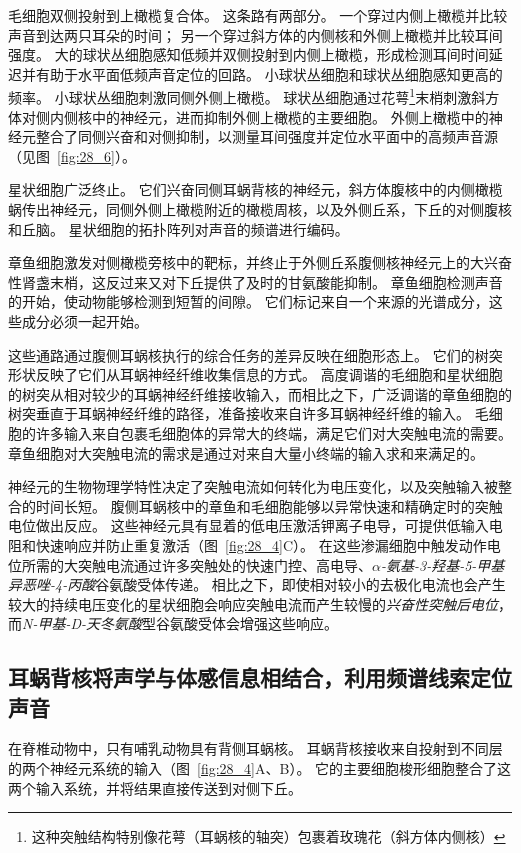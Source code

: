 毛细胞双侧投射到上橄榄复合体。
这条路有两部分。
一个穿过内侧上橄榄并比较声音到达两只耳朵的时间； 另一个穿过斜方体的内侧核和外侧上橄榄并比较耳间强度。
大的球状丛细胞感知低频并双侧投射到内侧上橄榄，形成检测耳间时间延迟并有助于水平面低频声音定位的回路。
小球状丛细胞和球状丛细胞感知更高的频率。
小球状丛细胞刺激同侧外侧上橄榄。
球状丛细胞通过花萼\footnote{这种突触结构特别像花萼（耳蜗核的轴突）包裹着玫瑰花（斜方体内侧核）}末梢刺激斜方体对侧内侧核中的神经元，进而抑制外侧上橄榄的主要细胞。
外侧上橄榄中的神经元整合了同侧兴奋和对侧抑制，以测量耳间强度并定位水平面中的高频声音源（见图~\ref{fig:28_6}）。


星状细胞广泛终止。
它们兴奋同侧耳蜗背核的神经元，斜方体腹核中的内侧橄榄蜗传出神经元，同侧外侧上橄榄附近的橄榄周核，以及外侧丘系，下丘的对侧腹核和丘脑。 
星状细胞的拓扑阵列对声音的频谱进行编码。


章鱼细胞激发对侧橄榄旁核中的靶标，并终止于外侧丘系腹侧核神经元上的大兴奋性肾盏末梢，这反过来又对下丘提供了及时的甘氨酸能抑制。
章鱼细胞检测声音的开始，使动物能够检测到短暂的间隙。
它们标记来自一个来源的光谱成分，这些成分必须一起开始。


这些通路通过腹侧耳蜗核执行的综合任务的差异反映在细胞形态上。
它们的树突形状反映了它们从耳蜗神经纤维收集信息的方式。
高度调谐的毛细胞和星状细胞的树突从相对较少的耳蜗神经纤维接收输入，而相比之下，广泛调谐的章鱼细胞的树突垂直于耳蜗神经纤维的路径，准备接收来自许多耳蜗神经纤维的输入。
毛细胞的许多输入来自包裹毛细胞体的异常大的终端，满足它们对大突触电流的需要。
章鱼细胞对大突触电流的需求是通过对来自大量小终端的输入求和来满足的。


神经元的生物物理学特性决定了突触电流如何转化为电压变化，以及突触输入被整合的时间长短。
腹侧耳蜗核中的章鱼和毛细胞能够以异常快速和精确定时的突触电位做出反应。
这些神经元具有显着的低电压激活钾离子电导，可提供低输入电阻和快速响应并防止重复激活（图~\ref{fig:28_4}C）。
在这些渗漏细胞中触发动作电位所需的大突触电流通过许多突触处的快速门控、高电导、\textit{$\alpha$-氨基-3-羟基-5-甲基异恶唑-4-丙酸}谷氨酸受体传递。
相比之下，即使相对较小的去极化电流也会产生较大的持续电压变化的星状细胞会响应突触电流而产生较慢的\textit{兴奋性突触后电位}，而\textit{N-甲基-D-天冬氨酸}型谷氨酸受体会增强这些响应。



\subsection{耳蜗背核将声学与体感信息相结合，利用频谱线索定位声音}

在脊椎动物中，只有哺乳动物具有背侧耳蜗核。
耳蜗背核接收来自投射到不同层的两个神经元系统的输入（图~\ref{fig:28_4}A、B）。
它的主要细胞梭形细胞整合了这两个输入系统，并将结果直接传送到对侧下丘。


